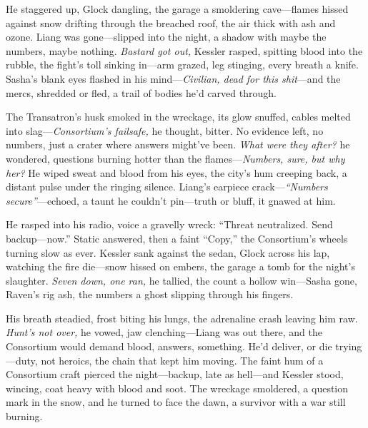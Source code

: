 \documentclass[12pt]{book}
\begin{document}
He staggered up, Glock dangling, the garage a smoldering cave—flames hissed against snow drifting through the breached roof, the air thick with ash and ozone. Liang was gone—slipped into the night, a shadow with maybe the numbers, maybe nothing. \textit{Bastard got out,} Kessler rasped, spitting blood into the rubble, the fight’s toll sinking in—arm grazed, leg stinging, every breath a knife. Sasha’s blank eyes flashed in his mind—\textit{Civilian, dead for this shit}—and the mercs, shredded or fled, a trail of bodies he’d carved through.

The Transatron’s husk smoked in the wreckage, its glow snuffed, cables melted into slag—\textit{Consortium’s failsafe,} he thought, bitter. No evidence left, no numbers, just a crater where answers might’ve been. \textit{What were they after?} he wondered, questions burning hotter than the flames—\textit{Numbers, sure, but why her?} He wiped sweat and blood from his eyes, the city’s hum creeping back, a distant pulse under the ringing silence. Liang’s earpiece crack—\textit{“Numbers secure”}—echoed, a taunt he couldn’t pin—truth or bluff, it gnawed at him.

He rasped into his radio, voice a gravelly wreck: “Threat neutralized. Send backup—now.” Static answered, then a faint “Copy,” the Consortium’s wheels turning slow as ever. Kessler sank against the sedan, Glock across his lap, watching the fire die—snow hissed on embers, the garage a tomb for the night’s slaughter. \textit{Seven down, one ran,} he tallied, the count a hollow win—Sasha gone, Raven’s rig ash, the numbers a ghost slipping through his fingers.

His breath steadied, frost biting his lungs, the adrenaline crash leaving him raw. \textit{Hunt’s not over,} he vowed, jaw clenching—Liang was out there, and the Consortium would demand blood, answers, something. He’d deliver, or die trying—duty, not heroics, the chain that kept him moving. The faint hum of a Consortium craft pierced the night—backup, late as hell—and Kessler stood, wincing, coat heavy with blood and soot. The wreckage smoldered, a question mark in the snow, and he turned to face the dawn, a survivor with a war still burning.
\end{document}
